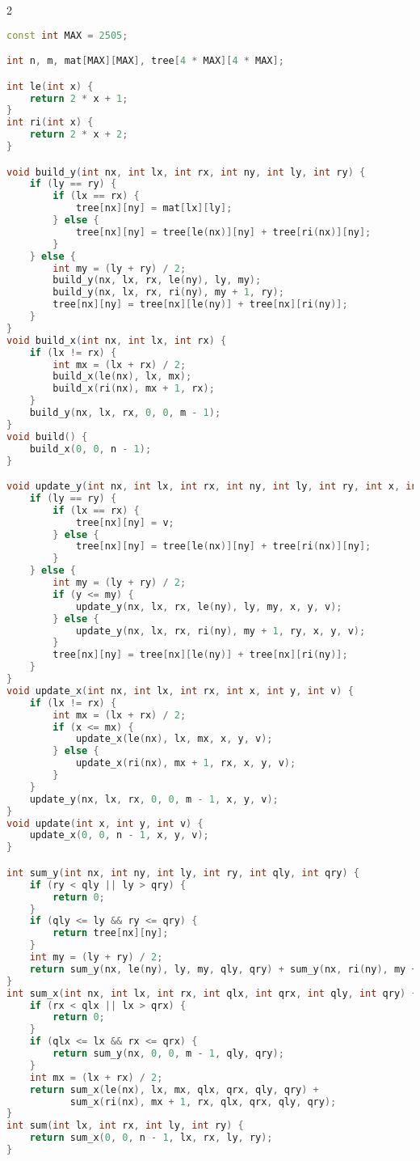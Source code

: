 \documentclass[11pt, a4paper, oneside]{book}
\begin{document}
\hfill

\begin{multicols}{2}
\begin{lstlisting}[language=C++]
const int MAX = 2505;

int n, m, mat[MAX][MAX], tree[4 * MAX][4 * MAX];

int le(int x) {
    return 2 * x + 1;
}
int ri(int x) {
    return 2 * x + 2;
}

void build_y(int nx, int lx, int rx, int ny, int ly, int ry) {
    if (ly == ry) {
        if (lx == rx) {
            tree[nx][ny] = mat[lx][ly];
        } else {
            tree[nx][ny] = tree[le(nx)][ny] + tree[ri(nx)][ny];
        }
    } else {
        int my = (ly + ry) / 2;
        build_y(nx, lx, rx, le(ny), ly, my);
        build_y(nx, lx, rx, ri(ny), my + 1, ry);
        tree[nx][ny] = tree[nx][le(ny)] + tree[nx][ri(ny)];
    }
}
void build_x(int nx, int lx, int rx) {
    if (lx != rx) {
        int mx = (lx + rx) / 2;
        build_x(le(nx), lx, mx);
        build_x(ri(nx), mx + 1, rx);
    }
    build_y(nx, lx, rx, 0, 0, m - 1);
}
void build() {
    build_x(0, 0, n - 1);
}

void update_y(int nx, int lx, int rx, int ny, int ly, int ry, int x, int y, int v) {
    if (ly == ry) {
        if (lx == rx) {
            tree[nx][ny] = v;
        } else {
            tree[nx][ny] = tree[le(nx)][ny] + tree[ri(nx)][ny];
        }
    } else {
        int my = (ly + ry) / 2;
        if (y <= my) {
            update_y(nx, lx, rx, le(ny), ly, my, x, y, v);
        } else {
            update_y(nx, lx, rx, ri(ny), my + 1, ry, x, y, v);
        }
        tree[nx][ny] = tree[nx][le(ny)] + tree[nx][ri(ny)];
    }
}
void update_x(int nx, int lx, int rx, int x, int y, int v) {
    if (lx != rx) {
        int mx = (lx + rx) / 2;
        if (x <= mx) {
            update_x(le(nx), lx, mx, x, y, v);
        } else {
            update_x(ri(nx), mx + 1, rx, x, y, v);
        }
    }
    update_y(nx, lx, rx, 0, 0, m - 1, x, y, v);
}
void update(int x, int y, int v) {
    update_x(0, 0, n - 1, x, y, v);
}

int sum_y(int nx, int ny, int ly, int ry, int qly, int qry) {
    if (ry < qly || ly > qry) {
        return 0;
    }
    if (qly <= ly && ry <= qry) {
        return tree[nx][ny];
    }
    int my = (ly + ry) / 2;
    return sum_y(nx, le(ny), ly, my, qly, qry) + sum_y(nx, ri(ny), my + 1, ry, qly, qry);
}
int sum_x(int nx, int lx, int rx, int qlx, int qrx, int qly, int qry) {
    if (rx < qlx || lx > qrx) {
        return 0;
    }
    if (qlx <= lx && rx <= qrx) {
        return sum_y(nx, 0, 0, m - 1, qly, qry);
    }
    int mx = (lx + rx) / 2;
    return sum_x(le(nx), lx, mx, qlx, qrx, qly, qry) +
           sum_x(ri(nx), mx + 1, rx, qlx, qrx, qly, qry);
}
int sum(int lx, int rx, int ly, int ry) {
    return sum_x(0, 0, n - 1, lx, rx, ly, ry);
}
\end{lstlisting}
\end{multicols}
\end{document}
